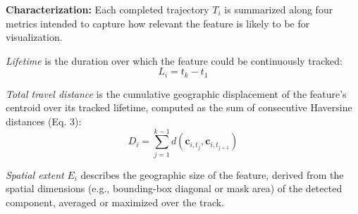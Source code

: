 \documentclass[journal abbreviation, manuscript]{copernicus}
\begin{document}
\textbf{Characterization:} Each completed trajectory $T_i$ is summarized along four metrics intended to capture how relevant the feature is likely to be for visualization.

\textit{Lifetime} is the duration over which the feature could be continuously tracked:
\begin{equation}
L_i = t_k - t_1
\tag{5}
\end{equation}

\textit{Total travel distance} is the cumulative geographic displacement of the feature's centroid over its tracked lifetime, computed as the sum of consecutive Haversine distances (Eq. 3):
\begin{equation}
D_i =
\sum_{j=1}^{k-1}
d\!\left(
\mathbf{c}_{i,t_j},
\mathbf{c}_{i,t_{j+1}}
\right)
\tag{6}
\end{equation}

\textit{Spatial extent} $E_i$ describes the geographic size of the feature, derived from the spatial dimensions (e.g., bounding-box diagonal or mask area) of the detected component, averaged or maximized over the track.
\end{document}
